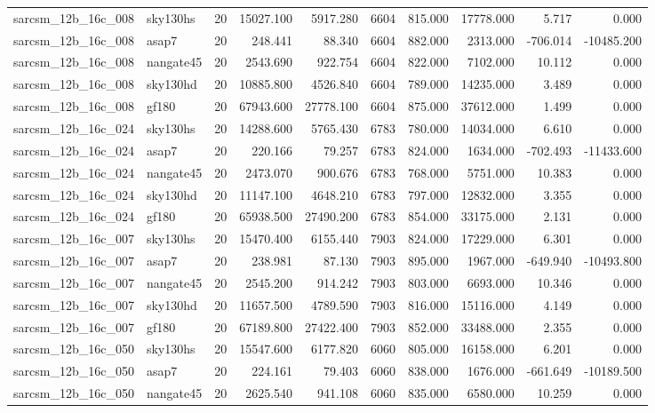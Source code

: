 \begin{longtable}{llrrrrrrrr}
sarcsm\_12b\_16c\_008 & sky130hs & 20 & 15027.100 & 5917.280 & 6604 & 815.000 & 17778.000 & 5.717 & 0.000 \\
sarcsm\_12b\_16c\_008 & asap7 & 20 & 248.441 & 88.340 & 6604 & 882.000 & 2313.000 & -706.014 & -10485.200 \\
sarcsm\_12b\_16c\_008 & nangate45 & 20 & 2543.690 & 922.754 & 6604 & 822.000 & 7102.000 & 10.112 & 0.000 \\
sarcsm\_12b\_16c\_008 & sky130hd & 20 & 10885.800 & 4526.840 & 6604 & 789.000 & 14235.000 & 3.489 & 0.000 \\
sarcsm\_12b\_16c\_008 & gf180 & 20 & 67943.600 & 27778.100 & 6604 & 875.000 & 37612.000 & 1.499 & 0.000 \\
sarcsm\_12b\_16c\_024 & sky130hs & 20 & 14288.600 & 5765.430 & 6783 & 780.000 & 14034.000 & 6.610 & 0.000 \\
sarcsm\_12b\_16c\_024 & asap7 & 20 & 220.166 & 79.257 & 6783 & 824.000 & 1634.000 & -702.493 & -11433.600 \\
sarcsm\_12b\_16c\_024 & nangate45 & 20 & 2473.070 & 900.676 & 6783 & 768.000 & 5751.000 & 10.383 & 0.000 \\
sarcsm\_12b\_16c\_024 & sky130hd & 20 & 11147.100 & 4648.210 & 6783 & 797.000 & 12832.000 & 3.355 & 0.000 \\
sarcsm\_12b\_16c\_024 & gf180 & 20 & 65938.500 & 27490.200 & 6783 & 854.000 & 33175.000 & 2.131 & 0.000 \\
sarcsm\_12b\_16c\_007 & sky130hs & 20 & 15470.400 & 6155.440 & 7903 & 824.000 & 17229.000 & 6.301 & 0.000 \\
sarcsm\_12b\_16c\_007 & asap7 & 20 & 238.981 & 87.130 & 7903 & 895.000 & 1967.000 & -649.940 & -10493.800 \\
sarcsm\_12b\_16c\_007 & nangate45 & 20 & 2545.200 & 914.242 & 7903 & 803.000 & 6693.000 & 10.346 & 0.000 \\
sarcsm\_12b\_16c\_007 & sky130hd & 20 & 11657.500 & 4789.590 & 7903 & 816.000 & 15116.000 & 4.149 & 0.000 \\
sarcsm\_12b\_16c\_007 & gf180 & 20 & 67189.800 & 27422.400 & 7903 & 852.000 & 33488.000 & 2.355 & 0.000 \\
sarcsm\_12b\_16c\_050 & sky130hs & 20 & 15547.600 & 6177.820 & 6060 & 805.000 & 16158.000 & 6.201 & 0.000 \\
sarcsm\_12b\_16c\_050 & asap7 & 20 & 224.161 & 79.403 & 6060 & 838.000 & 1676.000 & -661.649 & -10189.500 \\
sarcsm\_12b\_16c\_050 & nangate45 & 20 & 2625.540 & 941.108 & 6060 & 835.000 & 6580.000 & 10.259 & 0.000 \\

\end{longtable}
